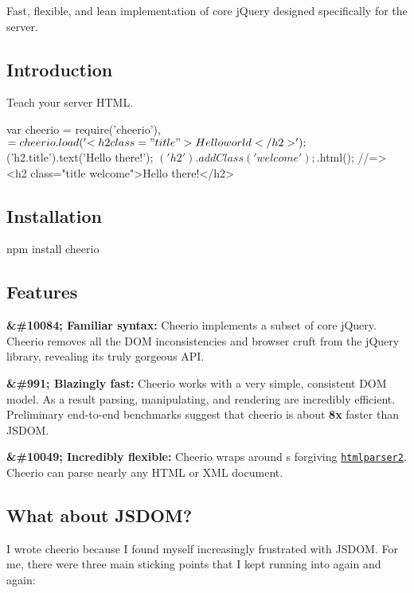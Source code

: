 Fast, flexible, and lean implementation of core j\+Query designed specifically for the server.

\subsection*{Introduction}

Teach your server H\+T\+ML.


\begin{DoxyCode}
var cheerio = require('cheerio'),
    $ = cheerio.load('<h2 class="title">Hello world</h2>');

$('h2.title').text('Hello there!');
$('h2').addClass('welcome');

$.html();
//=> <h2 class="title welcome">Hello there!</h2>
\end{DoxyCode}


\subsection*{Installation}

{\ttfamily npm install cheerio}

\subsection*{Features}

{\bfseries \&\#10084; Familiar syntax\+:} Cheerio implements a subset of core j\+Query. Cheerio removes all the D\+OM inconsistencies and browser cruft from the j\+Query library, revealing its truly gorgeous A\+PI.

{\bfseries \&\#991; Blazingly fast\+:} Cheerio works with a very simple, consistent D\+OM model. As a result parsing, manipulating, and rendering are incredibly efficient. Preliminary end-\/to-\/end benchmarks suggest that cheerio is about {\bfseries 8x} faster than J\+S\+D\+OM.

{\bfseries \&\#10049; Incredibly flexible\+:} Cheerio wraps around \textquotesingle{}s forgiving \href{https://github.com/fb55/htmlparser2/}{\tt htmlparser2}. Cheerio can parse nearly any H\+T\+ML or X\+ML document.

\subsection*{What about J\+S\+D\+OM?}

I wrote cheerio because I found myself increasingly frustrated with J\+S\+D\+OM. For me, there were three main sticking points that I kept running into again and again\+:

